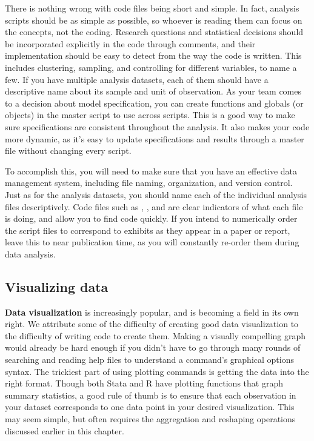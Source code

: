 There is nothing wrong with code files being short and simple.
In fact, analysis scripts should be as simple as possible,
so whoever is reading them can focus on the concepts, not the coding.
Research questions and statistical decisions should be incorporated explicitly in the code through comments,
and their implementation should be easy to detect from the way the code is written.
This includes clustering, sampling, and controlling for different variables, to name a few.
If you have multiple analysis datasets,
each of them should have a descriptive name about its sample and unit of observation.
As your team comes to a decision about model specification,
you can create functions and globals (or objects) in the master script to use across scripts.
This is a good way to make sure specifications are consistent throughout the analysis.
It also makes your code more dynamic,
as it's easy to update specifications and results
through a master file without changing every script.


To accomplish this, you will need to make sure that you have an effective data management system,
including file naming, organization, and version control.
Just as for the analysis datasets,
you should name each of the individual analysis files descriptively.
Code files such as ,
, and 
are clear indicators of what each file is doing, and allow you to find code quickly.
If you intend to numerically order the script files
to correspond to exhibits as they appear in a paper or report,
leave this to near publication time,
as you will constantly re-order them during data analysis.

\subsection{Visualizing data}

\textbf{Data visualization} is increasingly popular,
and is becoming a field in its own right.
We attribute some of the difficulty of creating good data visualization
to the difficulty of writing code to create them.
Making a visually compelling graph would already be hard enough if
you didn't have to go through many rounds of searching and reading help files
to understand a command's graphical options syntax.
The trickiest part of using plotting commands is getting the data into the right format.
Though both Stata and R have plotting functions that graph summary statistics,
a good rule of thumb is to ensure that each
observation in your dataset corresponds to one data point in your desired visualization.
This may seem simple,
but often requires the aggregation and reshaping operations
discussed earlier in this chapter.

